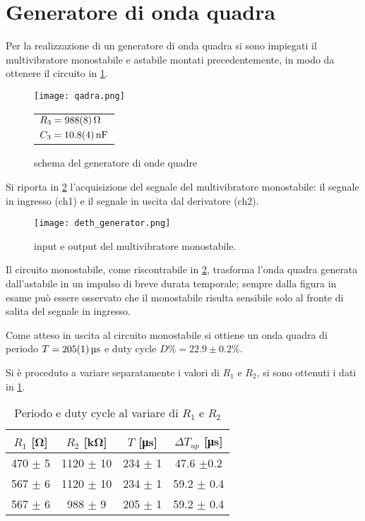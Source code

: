 
\section{Generatore di onda quadra}
	Per la realizzazione di un generatore di onda quadra si sono impiegati il multivibratore monostabile e astabile montati precedentemente, in modo da ottenere il circuito in \figurename{ \ref{f:qadra}}.

	\begin{figure}[H]
		\begin{minipage}{0.75\textwidth}
		\centering
		\texttt{[image: qadra.png]}
		\caption{schema del generatore di onde quadre}
		\label{f:qadra}
		\end{minipage}
		\begin{minipage}{0.14\textwidth}
			\begin{tabular}{l}
		$R_{3}=\SI{988 \pm 8}{\ohm}$\\
		$C_{3}=\SI{10.8 \pm 0.4 }{\nano \farad}$
			\end{tabular}
		\end{minipage}
	\end{figure}

	Si riporta in \figurename{ \ref{f:osci-qad}} l'acquisizione del segnale del multivibratore monostabile: il segnale in ingresso (ch1) e il segnale in uscita dal derivatore (ch2).

	\begin{figure}[H]
		\centering
		\texttt{[image: deth\_generator.png]}
		\caption{input e output del multivibratore monostabile.}
		\label{f:osci-qad}
	\end{figure}

	Il circuito monostabile, come riscontrabile in \figurename{ \ref{f:osci-qad}},
	trasforma l'onda quadra generata dall'astabile in un impulso di breve durata temporale; sempre dalla figura in esame può essere osservato che il monostabile risulta sensibile solo al fronte di salita del segnale in ingresso.

	Come atteso in uscita al circuito monostabile si ottiene un onda quadra di periodo $T=\SI{205 \pm 1 }{\us}$ e duty cycle $D\%= 22.9 \pm 0.2$\%.

	Si è proceduto a variare separatamente i valori di $R_{1}$ e $R_{2}$, si sono ottenuti i dati in \tablename{ \ref{t:4}}.

	\begin{table}[H]
		\centering
		\begin{tabular}{cccc}
			\toprule
			$R_{1}$ [\si{\ohm}] & $R_{2}$ [\si{\kilo \ohm}] & $T$ [\si{\us}] & $\Delta T_{up}$  [\si{\us}] \\
			\midrule
			470 $\pm$ 5	&	1120 $\pm$ 10	&	234 $\pm$ 1	&	47.6 $\pm $0.2	\\
			567 $\pm$ 6	&	1120 $\pm$ 10	&	234 $\pm$ 1	&	59.2 $ \pm$ 0.4		\\
			567 $\pm$ 6	&	988 $\pm$ 9	&	205 $\pm$ 1	&	59.2 $\pm$ 0.4		\\
			\bottomrule
		\end{tabular}
		\caption{Periodo e duty cycle al variare di $R_1$ e $R_2$}
		\label{t:4}
	\end{table}

